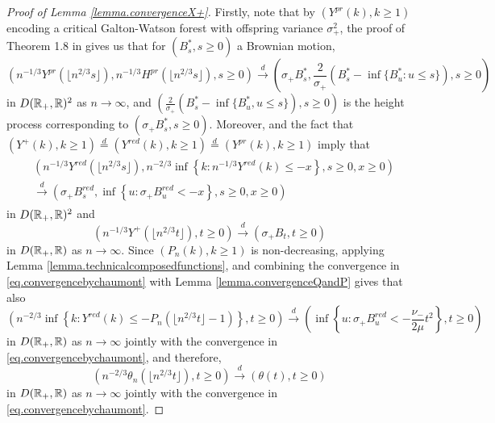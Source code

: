 \begin{proof}[Proof of Lemma \ref{lemma.convergenceX+}]
Firstly, note that by $(Y^{pr}(k),k\geq 1)$ encoding a critical Galton-Watson forest with offspring variance $\sigma_+^2$, the proof of Theorem 1.8 in \cite{Legall2005} gives us that for $(B^*_s,s\geq 0)$ a Brownian motion,
\begin{equation}\label{eq.convergenceX}\left(n^{-1/3}Y^{pr}\left(\lfloor n^{2/3}s\rfloor \right), n^{-1/3}H^{pr}\left(\lfloor n^{2/3}s\rfloor \right), s\geq 0 \right) \overset{d}{\to} \left(\sigma_+ B^*_s,\frac{2}{\sigma_+} \left(B^*_s-\inf\{B^*_u:u\leq s\}\right),  s\geq 0\right) \end{equation}
 in $D({\mathbb R}_+,{\mathbb R})^2$ as $n\to \infty$, and $\left(\frac{2}{\sigma_+}(B^*_s-\inf\{B^*_u,u\leq s\}),s\geq 0\right)$ is the height process corresponding to $\left(\sigma_+ B^*_s,s \geq 0\right)$. Moreover, \cite{Chaumont2010} and the fact that $(Y^+(k),k\geq 1)\overset{d}{=}(Y^{red}(k),k\geq 1)\overset{d}{=}(Y^{pr}(k),k\geq 1)$ imply that
\begin{align}\begin{split}\label{eq.convergencebychaumont}&\left(n^{-1/3}Y^{red}\left(\lfloor n^{2/3} s \rfloor \right), n^{-2/3}\inf\left\{k:n^{-1/3}Y^{red}(k) \leq -x\right\}, s \geq 0, x\geq 0 \right)\\
&\overset{d}{\to}\left( \sigma_+ B^{red}_s, \inf\left\{u:\sigma_+ B^{red}_u < -x\right\}, s\geq 0, x \geq 0\right)\end{split}\end{align}
in $D({\mathbb R}_+,{\mathbb R})^2$ and 
$$\left(n^{-1/3}Y^+\left(\lfloor n^{2/3} t\rfloor \right),t\geq 0\right)\overset{d}{\to}\left(\sigma_+ B_t, t\geq 0\right)$$
in $D({\mathbb R}_+,{\mathbb R})$ as $n\to \infty$. 
Since $(P_n(k),k\geq 1)$ is non-decreasing, applying Lemma \ref{lemma.technicalcomposedfunctions}, and combining the convergence in \eqref{eq.convergencebychaumont} with Lemma \ref{lemma.convergenceQandP} gives that also
$$\left(n^{-2/3}\inf\left\{k:Y^{red}(k) \leq - P_n\left(\lfloor n^{2/3} t \rfloor -1\right)\right\},t\geq 0\right)\overset{d}{\to}\left(\inf\left\{u:\sigma_+ B^{red}_u< -\frac{\nu_-}{2\mu} t^2\right\},t\geq 0\right)$$
  in $D({\mathbb R}_+,{\mathbb R})$ as $n\to \infty$ jointly with the convergence in \eqref{eq.convergencebychaumont},
  and therefore, 
 \begin{equation}\label{eq.convergencetheta}\left(n^{-2/3}\theta_n\left(\lfloor n^{2/3}t\rfloor \right),t\geq 0 \right) \overset{d}{\to} \left(\theta(t),t\geq 0\right)\end{equation}
  in $D({\mathbb R}_+,{\mathbb R})$ as $n\to \infty$ jointly with the convergence in \eqref{eq.convergencebychaumont}.

\end{proof}
